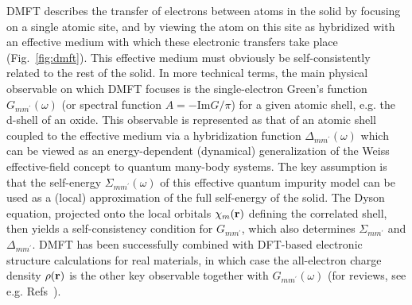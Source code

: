 \documentclass[]{ar2e-changed}%
\def\vk{{\bf k}}
\def\vr{{\bf r}}
\def\mp{m^\prime}
\begin{document}
DMFT describes the transfer of electrons between atoms in the solid by focusing on a single atomic site, and by 
viewing the atom on this site as hybridized with an effective medium with which these electronic transfers 
take place (Fig.~\ref{fig:dmft}). 
%
This effective medium must obviously be self-consistently related to the rest of the solid. 
%
In more technical terms, the main physical observable on which DMFT focuses is the single-electron Green's function 
$G_{m\mp}(\omega)$ (or spectral function $A=-\mathrm{Im}G/\pi$) for a given atomic shell, e.g. the d-shell of an oxide. 
%
This observable is represented as that of an atomic shell coupled to the effective medium via a 
hybridization function $\Delta_{m\mp}(\omega)$ which can be viewed as an energy-dependent (dynamical)  
generalization of the Weiss effective-field concept to quantum many-body systems. 
%
The key assumption is that the self-energy $\Sigma_{m\mp}(\omega)$ of this effective quantum impurity model can 
be used as a (local) approximation of the full self-energy of the solid. 
%
The Dyson equation, projected onto the local orbitals $\chi_m(\vr)$ defining the correlated shell, then 
yields a self-consistency condition for $G_{m\mp}$, which also determines $\Sigma_{m\mp}$ and $\Delta_{m\mp}$.
%  
%
DMFT has been successfully combined with DFT-based electronic structure calculations for real materials, in which 
case the all-electron charge density $\rho(\vr)$ is the other key observable together with $G_{m\mp}(\omega)$ 
(for reviews, see e.g. Refs~\cite{kotliar_review_rmp_2006,held_review_advphys_2007,georges_strong,
imada_review_jpsj_2010}). 
\end{document}
